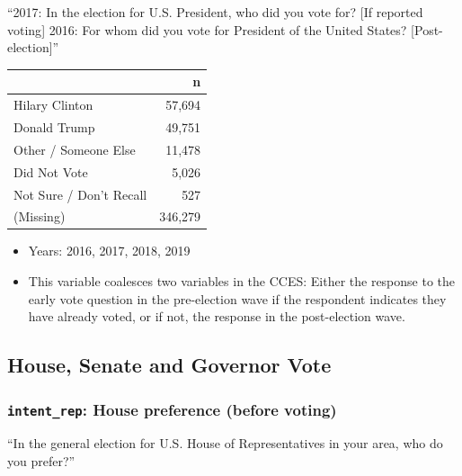 \documentclass[10pt,article,oneside]{memoir}
\theoremstyle{definition}
\begin{document}
``2017: In the election for U.S. President, who did you vote for? {[}If
reported voting{]} 2016: For whom did you vote for President of the
United States? {[}Post-election{]}''

\begin{table}[H]
\centering
\begin{tabular}{lr}
\toprule
 & n\\
\midrule
Hilary Clinton & 57,694\\
Donald Trump & 49,751\\
Other / Someone Else & 11,478\\
Did Not Vote & 5,026\\
Not Sure / Don't Recall & 527\\
(Missing) & 346,279\\
\bottomrule
\end{tabular}
\end{table}

\begin{itemize}
\tightlist
\item
  Years: 2016, 2017, 2018, 2019
\item
  This variable coalesces two variables in the CCES: Either the response
  to the early vote question in the pre-election wave if the respondent
  indicates they have already voted, or if not, the response in the
  post-election wave.
\end{itemize}

\hypertarget{house-senate-and-governor-vote}{%
\subsection{House, Senate and Governor
Vote}\label{house-senate-and-governor-vote}}

\hypertarget{intent_rep-house-preference-before-voting}{%
\subsubsection{\texorpdfstring{\texttt{intent\_rep}: House preference
(before
voting)}{intent\_rep: House preference (before voting)}}\label{intent_rep-house-preference-before-voting}}

``In the general election for U.S. House of Representatives in your
area, who do you prefer?''
\end{document}
